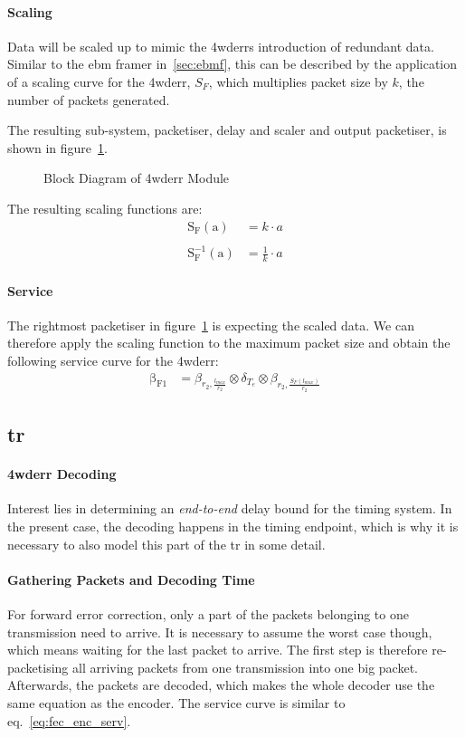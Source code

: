 \paragraph{Scaling}
Data will be scaled up to mimic the \gls{4wderr}s introduction of redundant data.
Similar to the \gls{ebm} framer in~\ref{sec:ebmf}, this can be described by the application of a scaling curve for the \gls{4wderr}, $S_F$,
which multiplies packet size by $k$, the number of packets generated.
\par
The resulting sub-system, packetiser, delay and scaler and output packetiser,
is shown in figure~\ref{fig:fec}.
\begin{figure}[H]
  \centering
  \def\svgwidth{0.6875\textwidth}
  
  \caption{Block Diagram of \gls{4wderr} Module}
  \label{fig:fec}
\end{figure}
\noindent
The resulting scaling functions are:
%
\begin{equation}
\begin{aligned}
\mathrm{S_{F}(a)} &= k \cdot a \\
\\
\mathrm{S^{-1}_{F}(a)} &= \frac{1}{k} \cdot a
\end{aligned}
\end{equation}
%
\paragraph{Service}
The rightmost packetiser in figure~\ref{fig:fec} is expecting the scaled data. We can therefore apply the scaling function to the maximum packet size and obtain
the following service curve for the \gls{4wderr}:
%
\begin{align}
\mathrm{\beta_{F1}} &= \beta_{r_2,\frac{l_{max}}{r_2}} \otimes \delta_{T_e} \otimes \beta_{r_2,\frac{S_F\left(l_{max}\right)}{r_2}} \label{eq:fec_enc_serv}
\end{align}
%
\subsection{\gls{tr}}
\paragraph{\gls{4wderr} Decoding}
Interest lies in determining an \emph{end-to-end} delay bound for the timing system.
In the present case, the decoding happens in the timing endpoint, which is why it is necessary to also model this part of the \gls{tr} in some detail.
\paragraph{Gathering Packets and Decoding Time}
For forward error correction, only a part of the packets belonging to one transmission need to arrive.
It is necessary to assume the worst case though, which means waiting for the last packet to arrive.
The first step is therefore re-packetising all arriving packets from one transmission into one big packet.
Afterwards, the packets are decoded, which makes the whole decoder use the same equation as the encoder.
The service curve is similar to eq.~\ref{eq:fec_enc_serv}.
